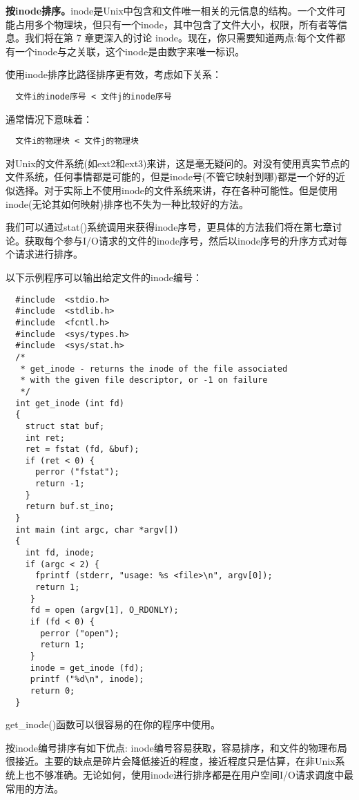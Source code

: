 \textbf{按inode排序。}inode是Unix中包含和文件唯一相关的元信息的结构。一个文件可能占用多个物理块，但只有一个inode，其中包含了文件大小，权限，所有者等信息。我们将在第 7 章更深入的讨论 inode。现在，你只需要知道两点:每个文件都有一个inode与之关联，这个inode是由数字来唯一标识。

使用inode排序比路径排序更有效，考虑如下关系：

\begin{verbatim}
  文件i的inode序号 < 文件j的inode序号
\end{verbatim}

通常情况下意味着：

\begin{verbatim}
  文件i的物理块 < 文件j的物理块
\end{verbatim}

对Unix的文件系统(如ext2和ext3)来讲，这是毫无疑问的。对没有使用真实节点的文件系统，任何事情都是可能的，但是inode号(不管它映射到哪)都是一个好的近似选择。对于实际上不使用inode的文件系统来讲，存在各种可能性。但是使用inode(无论其如何映射)排序也不失为一种比较好的方法。

我们可以通过stat()系统调用来获得inode序号，更具体的方法我们将在第七章讨论。获取每个参与I/O请求的文件的inode序号，然后以inode序号的升序方式对每个请求进行排序。

以下示例程序可以输出给定文件的inode编号：

\begin{lstlisting}
  #include  <stdio.h>
  #include  <stdlib.h>
  #include  <fcntl.h>
  #include  <sys/types.h>
  #include  <sys/stat.h>
  /*
   * get_inode - returns the inode of the file associated
   * with the given file descriptor, or -1 on failure
   */
  int get_inode (int fd)
  {
    struct stat buf;
    int ret;
    ret = fstat (fd, &buf);
    if (ret < 0) {
      perror ("fstat");
      return -1;
    }
    return buf.st_ino;
  }
  int main (int argc, char *argv[])
  {
    int fd, inode;
    if (argc < 2) {
      fprintf (stderr, "usage: %s <file>\n", argv[0]);
      return 1;
     }
     fd = open (argv[1], O_RDONLY);
     if (fd < 0) {
       perror ("open");
       return 1;
     }
     inode = get_inode (fd);
     printf ("%d\n", inode);
     return 0;
  }
 \end{lstlisting}

get\_inode()函数可以很容易的在你的程序中使用。

按inode编号排序有如下优点: inode编号容易获取，容易排序，和文件的物理布局很接近。主要的缺点是碎片会降低接近的程度，接近程度只是估算，在非Unix系统上也不够准确。无论如何，使用inode进行排序都是在用户空间I/O请求调度中最常用的方法。

